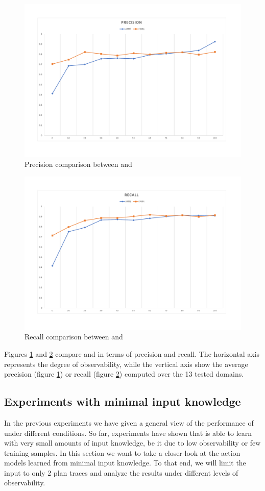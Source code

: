 \begin{figure}[hbt!]
	\centering
	\includegraphics[width=.8\linewidth]{figures/comparison_precision.pdf}
	\caption{Precision comparison between \FAMA and \ARMS}
	\label{fig:comparison_precision}
\end{figure}

\begin{figure}[hbt!]
	\centering
	\includegraphics[width=.8\linewidth]{figures/comparison_recall.pdf}
	\caption{Recall comparison between \FAMA and \ARMS}
	\label{fig:comparison_recall}
\end{figure}

Figures \ref{fig:comparison_precision} and \ref{fig:comparison_recall} compare \FAMA and \ARMS in terms of precision and recall. The horizontal axis represents the degree of observability, while the vertical axis show the average precision (figure \ref{fig:comparison_precision}) or recall (figure \ref{fig:comparison_recall}) computed over the 13 tested domains.

\subsection{Experiments with minimal input knowledge}
In the previous experiments we have given a general view of the performance of \FAMA under different conditions. So far, experiments have shown that \FAMA is able to learn with very small amounts of input knowledge, be it due to low observability or few training samples. In this section we want to take a closer look at the action models learned from minimal input knowledge. To that end, we will limit the input to only 2 plan traces and analyze the results under different levels of observability.

